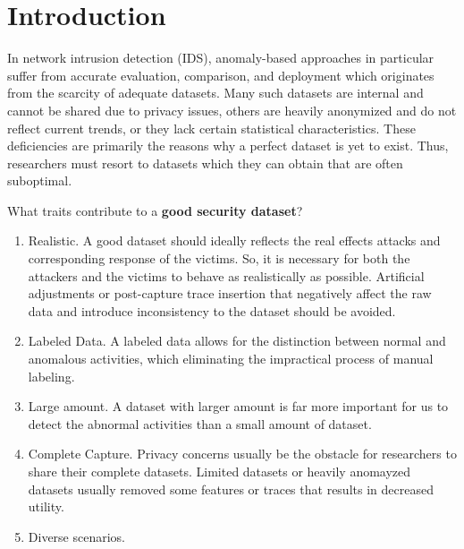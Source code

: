 \section{Introduction}

In network intrusion detection (IDS), anomaly-based approaches in particular suffer from accurate evaluation, comparison, and deployment which originates from the scarcity of adequate datasets. Many such datasets are internal and cannot be shared due to privacy issues, others are heavily anonymized and do not reflect current trends, or they lack certain statistical characteristics. These deficiencies are primarily the reasons why a perfect dataset is yet to exist. Thus, researchers must resort to datasets which they can obtain that are often suboptimal.

What traits contribute to a \textbf{good security dataset}? ~\cite{shiravi2012toward}
\begin{enumerate}
    \item Realistic. A good dataset should ideally reflects the real effects attacks and corresponding response of the victims. So, it is necessary for both the attackers and the victims to behave as realistically as possible. Artificial adjustments or post-capture trace insertion that negatively affect the raw data and introduce inconsistency to the dataset should be avoided.
    \item Labeled Data. A labeled data allows for the distinction between normal and anomalous activities, which eliminating the impractical process of manual labeling.
    \item Large amount. A dataset with larger amount is far more important for us to detect the abnormal activities than a small amount of dataset. 
    \item Complete Capture. Privacy concerns usually be the obstacle for researchers to share their complete datasets. Limited datasets or heavily anomayzed datasets usually removed some features or traces that results in decreased utility. 
    \item Diverse scenarios.
\end{enumerate}